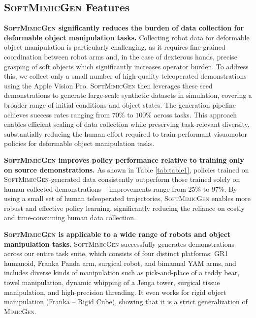 \documentclass[letterpaper, 10 pt, conference]{ieeeconf}  %
\newcommand{\sysName}{\textsc{SoftMimicGen}\xspace}
\newcommand{\MimicGen}{\textsc{MimicGen}\xspace}
\begin{document}
\subsection{\sysName Features}
\label{subsec:features}


\textbf{\sysName significantly reduces the burden of data collection for deformable object manipulation tasks.} Collecting robot data for deformable object manipulation is particularly challenging, as it requires fine-grained coordination between robot arms and, in the case of dexterous hands, precise grasping of soft objects which significantly increases operator burden. To address this, we collect only a small number of high-quality teleoperated demonstrations using the Apple Vision Pro. \sysName then leverages these seed demonstrations to generate large-scale synthetic datasets in simulation, covering a broader range of initial conditions and object states. The generation pipeline achieves success rates ranging from $70\%$ to $100\%$ across tasks. This approach enables efficient scaling of data collection while preserving task-relevant diversity, substantially reducing the human effort required to train performant visuomotor policies for deformable object manipulation tasks.


\textbf{\sysName improves policy performance relative to training only on source demonstrations.} As shown in Table \ref{tab:table1}, policies trained on \sysName-generated data consistently outperform those trained solely on human-collected demonstrations -- improvements range from $25\%$ to $97\%$. By using a small set of human teleoperated trajectories, \sysName enables more robust and effective policy learning, significantly reducing the reliance on costly and time-consuming human data collection.


\textbf{\sysName is applicable to a wide range of robots and object manipulation tasks.} 
\sysName successfully generates demonstrations across our entire task suite, which consists of four distinct platforms: GR1 humanoid, Franka Panda arm, surgical robot, and bimanual YAM arms, and includes diverse kinds of manipulation such as pick-and-place of a teddy bear, towel manipulation, dynamic whipping of a Jenga tower, surgical tissue manipulation, and high-precision threading. It even works for rigid object manipulation (Franka -- Rigid Cube), showing that it is a strict generalization of \MimicGen.






\end{document}
